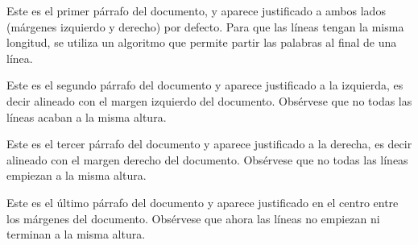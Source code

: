 \documentclass[a4paper, 10pt]{article}
\begin{document}
Este es el primer párrafo del documento, y aparece justificado a ambos lados
(márgenes izquierdo y derecho) por defecto. Para que las líneas tengan la 
misma longitud, se utiliza un algoritmo que permite partir las palabras al 
final de una línea.

\begin{flushleft}
Este es el segundo párrafo del documento y aparece justificado a la 
izquierda, es decir alineado con el margen izquierdo del documento. 
Obsérvese que no todas las líneas acaban a la misma altura.
\end{flushleft}

\begin{flushright}
Este es el tercer párrafo del documento y aparece justificado a la derecha,
es decir alineado con el margen derecho del documento. Obsérvese que no 
todas las líneas empiezan a la misma altura.
\end{flushright}

\begin{center}
Este es el último párrafo del documento y aparece justificado en el centro
entre los márgenes del documento. Obsérvese que ahora las líneas no 
empiezan ni terminan a la misma altura.
\end{center}
\end{document}
